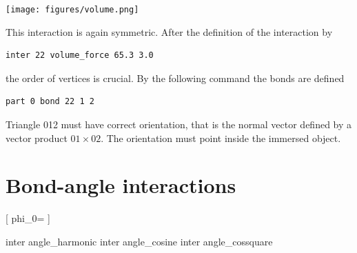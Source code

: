 \begin{center}
  \texttt{[image: figures/volume.png]}
\end{center}
This interaction is again symmetric. After the definition of the interaction by 
\begin{verbatim} 
inter 22 volume_force 65.3 3.0
\end{verbatim}
the order of vertices is crucial. By the following command the bonds are defined
\begin{verbatim} 
part 0 bond 22 1 2
\end{verbatim}
Triangle 012 must have correct orientation, that is the normal vector defined by a 
vector product $01\times02$. The orientation must point inside the immersed object.


\section{Bond-angle interactions}
\label{sec:angle}

\begin{pysyntax}
  [
    phi_0=
  ]
\end{pysyntax}

\begin{essyntax}
   inter  angle\_harmonic  
   inter  angle\_cosine  
   inter  angle\_cossquare  
  \begin{features}
  \end{features}
\end{essyntax}

